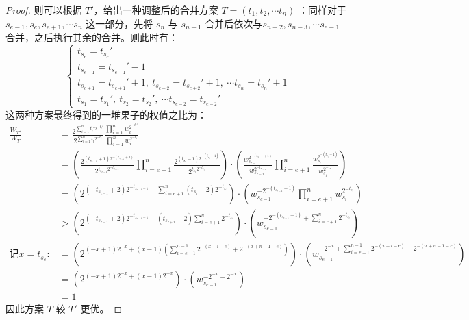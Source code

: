 \documentclass[11pt]{article}
\begin{document}
\begin{proof}
        则可以根据 $T'$，给出一种调整后的合并方案 $T=(t_1, t_2, \cdots t_n)$ ：同样对于 $s_{e-1}, s_{e}, s_{e+1}, \cdots s_n$ 这一部分，先将 $s_n$ 与 $s_{n-1}$ 合并后依次与$s_{n-2}, s_{n-3}, \cdots s_{e-1}$ 合并，之后执行其余的合并。则此时有：
        \begin{equation}
            \begin{cases}
                t_{s_e}=t_{s_{e}}' \\
                t_{s_{e-1}} = t_{s_{e-1}}'-1\\
                t_{s_{e+1}} = t_{s_{e+1}}'+1,\ t_{s_{e+2}} = t_{s_{e+2}}'+1,\ \cdots t_{s_{n}} = t_{s_{n}}'+1\\
                t_{s_{1}} = t_{s_{1}}',\ t_{s_{2}} = t_{s_{2}}',\ \cdots t_{s_{e-2}} = t_{s_{e-2}}'
            \end{cases}
        \end{equation}
        这两种方案最终得到的一堆果子的权值之比为：
        \begin{equation}
            \begin{aligned}
                \frac{W_{T'}}{W_{T}} 
                & = \frac{2^{\sum_{i=1}^{n}{t_i'2^{-t_i'}}}}{2^{\sum_{i=1}^{n}{t_i2^{-t_i}}}}
                    \frac{\prod_{i=1}^{n}{w_{i}^{2^{-t_i'}}}}{\prod_{i=1}^{n}{w_{i}^{2^{-t_i}}}}\\
                & = (\frac{2^{(t_{s_{e-1}}+1)2^{-(t_{s_{e-1}}+1)}}}{2^{t_{s_{e-1}}2^{-t_{s_{e-1}}}}}\prod_{i=e+1}^{n}   {\frac{2^{(t_{s_i}-1)2^{-(t_{s_i}-1)}}}{2^{t_{s_i}2^{-t_{s_i}}}}})
                     \cdot (\frac{w_{s_{e-1}}^{2^{-(t_{s_{e-1}}+1)}}}{w_{s_{e-1}}^{2^{-t_{s_{e-1}}}}}\prod_{i=e+1}^{n}{\frac{w_{s_i}^{2^{-(t_{s_i}-1)}}}{w_{s_i}^{2^{-t_{s_i}}}}})\\
                & = (2^{(-t_{s_{e-1}}+2)2^{-t_{s_{e-1}+1}}+\sum_{i=e+1}^{n}{{(t_{s_i}-2)2^{-t_{s_i}}}}})
                     \cdot (w_{s_{e-1}}^{-2^{-(t_{s_{e-1}}+1)}}\prod_{i=e+1}^{n}w_{s_i}^{2^{-t_{s_i}}})\\
                & > (2^{(-t_{s_{e-1}}+2)2^{-t_{s_{e-1}+1}}+(t_{s_{e+1}}-2)\sum_{i=e+1}^{n}{{2^{-t_{s_i}}}}})
                     \cdot (w_{s_{e-1}}^{-2^{-(t_{s_{e-1}}+1)}+\sum_{i=e+1}^{n}{2^{-t_{s_i}}}})\\
                \text{记} x=t_{s_{e}}: 
                & = (2^{(-x+1)2^{-x}+(x-1)(\sum_{i=e+1}^{n-1}{{2^{-(x+i-e)}}}+2^{-(x+n-1-e)})})
                     \cdot (w_{s_{e-1}}^{-2^{-x}+\sum_{i=e+1}^{n-1}{2^{-(x+i-e)}}+2^{-(x+n-1-e)}})\\
                & = (2^{(-x+1)2^{-x}+(x-1)2^{-x}}) \cdot (w_{s_{e-1}}^{-2^{-x}+2^{-x}})\\
                & = 1
            \end{aligned}
        \end{equation}
        因此方案 $T$ 较 $T'$ 更优。


\end{proof}
\end{document}
